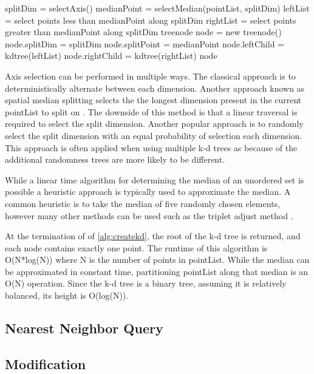 \begin{algorithmic}
\label{alg:createkd}
	\State splitDim = selectAxis()
	\State
	\State medianPoint = selectMedian(pointList, splitDim)
	\State leftList = select points less than medianPoint along splitDim
	\State rightList = select points greater than medianPoint along splitDim
	\State
	\State treenode node = new treenode()
	\State node.splitDim = splitDim
	\State node.splitPoint = medianPoint
	\State node.leftChild = kdtree(leftList)
	\State node.rightChild = kdtree(rightList)
	\State
	\State \Return node
\EndFunction
\end{algorithmic}

Axis selection can be performed in multiple ways.  The classical approach is to deterministically alternate between each dimension.  Another approach known as spatial median splitting selects the the longest dimension present in the current pointList to split on \citep{zhou2008real}.  The downside of this method is that a linear traversal is required to select the split dimension.  Another popular approach is to randomly select the split dimension with an equal probability of selection each dimension.  This approach is often applied when using multiple k-d trees as because of the additional randomness trees are more likely to be different.

While a linear time algorithm for determining the median of an unordered set is possible \cite{megiddo1984linear} a heuristic approach is typically used to approximate the median.  A common heuristic is to take the median of five randomly chosen elements, however many other methods can be used such as the triplet adjust method \cite{battiato2000efficient}.

At the termination of of \ref{alg:createkd}, the root of the k-d tree is returned, and each node contains exactly one point.  The runtime of this algorithm is O(N*log(N)) where N is the number of points in pointList.  While the median can be approximated in constant time, partitioning pointList along that median is an O(N) operation.  Since the k-d tree is a binary tree, assuming it is relatively balanced, its height is O(log(N)).

\subsection{Nearest Neighbor Query}

\subsection{Modification}

